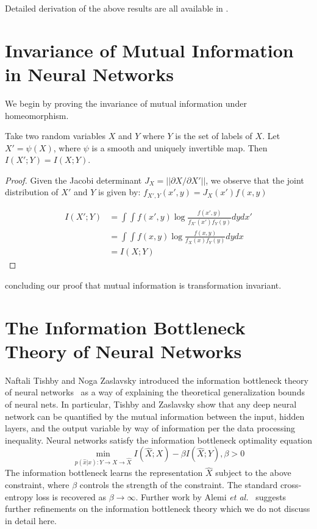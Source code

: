 Detailed derivation of the above results are all available in \cite{coverthomas2006}.

\section{Invariance of Mutual Information in Neural Networks}

We begin by proving the invariance of mutual information under homeomorphism.

\begin{theorem}
Take two random variables $X$ and $Y$ where $Y$ is the set of labels of $X$.
Let $X' = \psi(X)$, where $\psi$ is a smooth and uniquely invertible map.
Then $I(X'; Y) = I(X; Y)$.
\end{theorem}

\begin{proof}
Given the Jacobi determinant $J_X = ||\partial X/ \partial X'||$, we observe that the joint distribution of $X'$ and $Y$ is given by: $f_{X', Y}(x', y) = J_X(x')f(x, y)$

\begin{align*}
I(X'; Y) & = \int \int f(x', y) \log \frac{f(x', y)}{f_{X'}(x') f_{Y}(y)} dy dx'\\
& = \int \int f(x, y) \log \frac{f(x, y)}{f_{X}(x) f_{Y}(y)} dy dx \\
& = I(X; Y)
\end{align*}
\end{proof}
concluding our proof that mutual information is transformation invariant. 

\section{The Information Bottleneck Theory of Neural Networks}
Naftali Tishby and Noga Zaslavsky introduced the information bottleneck theory of neural networks~\cite{tishby2015deep} as a way of explaining the theoretical generalization bounds of neural nets.
In particular, Tishby and Zaslavsky show that any deep neural network can be quantified by the mutual information between the input, hidden layers, and the output variable by way of information per the data processing inequality.
Neural networks satisfy the information bottleneck optimality equation
$$\min_{p(\hat{x}|x):Y \to X \to \hat{X}} I(\hat{X};X) - \beta I(\hat{X}; Y) , \beta > 0$$
The information bottleneck learns the representation $\hat{X}$ subject to the above constraint, where $\beta$ controls the strength of the constraint.
The standard cross-entropy loss is recovered as $\beta \to \infty$. 
Further work by Alemi \textit{et al.}~\cite{alemi2016deep} suggests further refinements on the information bottleneck theory which we do not discuss in detail here. 


